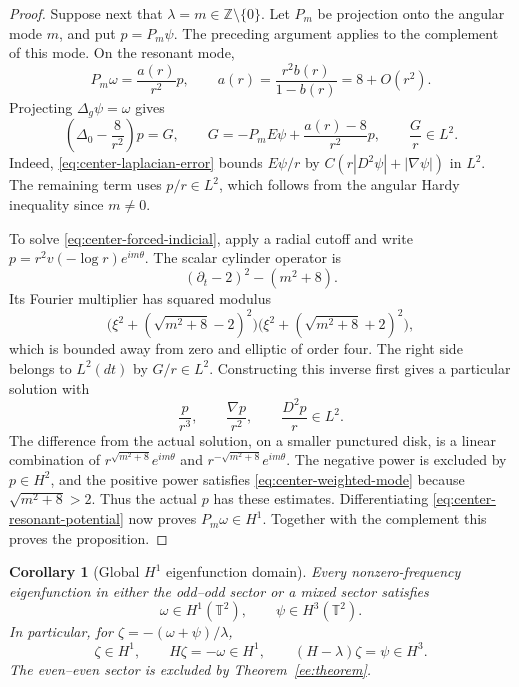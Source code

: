 \documentclass[reqno,11pt]{amsart}
\numberwithin{equation}{section}
\newtheorem{corollary}[theorem]{Corollary}
\theoremstyle{remark}
\begin{document}
\begin{proof}
Suppose next that $\lambda=m\in\mathbb Z\setminus\{0\}$.
Let $P_m$ be projection onto the angular mode $m$, and put
$p=P_m\psi$.  The preceding argument applies to the complement
of this mode.  On the resonant mode,
\begin{equation}
 P_m\omega=\frac{a(r)}{r^2}p,
 \qquad a(r)=\frac{r^2b(r)}{1-b(r)}=8+O(r^2).
 \label{eq:center-resonant-potential}
\end{equation}
Projecting $\Delta_g\psi=\omega$ gives
\begin{equation}
 \left(\Delta_0-\frac8{r^2}\right)p=G,
 \qquad G=-P_m E\psi+\frac{a(r)-8}{r^2}p,
 \qquad \frac Gr\in L^2.
 \label{eq:center-forced-indicial}
\end{equation}
Indeed, \eqref{eq:center-laplacian-error} bounds
$E\psi/r$ by $C(r|D^2\psi|+|\nabla\psi|)$ in $L^2$.
The remaining term uses $p/r\in L^2$, which follows from
the angular Hardy inequality since $m\ne0$.

To solve \eqref{eq:center-forced-indicial}, apply a radial cutoff and write
$p=r^2v(-\log r)e^{im\theta}$.
The scalar cylinder operator is
\[
 (\partial_t-2)^2-(m^2+8).
\]
Its Fourier multiplier has squared modulus
\[
 \big(\xi^2+(\sqrt{m^2+8}-2)^2\big)
 \big(\xi^2+(\sqrt{m^2+8}+2)^2\big),
\]
which is bounded away from zero and elliptic of order four.
The right side belongs to $L^2(dt)$ by $G/r\in L^2$.
Constructing this inverse first gives a particular solution with
\begin{equation}
 \frac p{r^3},\qquad\frac{\nabla p}{r^2},\qquad
 \frac{D^2p}r\in L^2.
 \label{eq:center-weighted-mode}
\end{equation}
The difference from the actual solution, on a smaller punctured
disk, is a linear combination of
$r^{\sqrt{m^2+8}}e^{im\theta}$ and
$r^{-\sqrt{m^2+8}}e^{im\theta}$.
The negative power is excluded by $p\in H^2$, and the positive
power satisfies \eqref{eq:center-weighted-mode} because
$\sqrt{m^2+8}>2$.  Thus the actual $p$ has these estimates.
Differentiating \eqref{eq:center-resonant-potential} now proves
$P_m\omega\in H^1$.  Together with the complement this proves
the proposition.
\end{proof}

\begin{corollary}[Global $H^1$ eigenfunction domain]
\label{cor:global-eigenfunction-h1}
Every nonzero-frequency eigenfunction in either the odd--odd
sector or a mixed sector satisfies
\[
 \omega\in H^1(\mathbb T^2),\qquad \psi\in H^3(\mathbb T^2).
\]
In particular, for $\zeta=-(\omega+\psi)/\lambda$,
\[
 \zeta\in H^1,\qquad H\zeta=-\omega\in H^1,
 \qquad (H-\lambda)\zeta=\psi\in H^3.
\]
The even--even sector is excluded by Theorem~\ref{ee:theorem}.
\end{corollary}
\end{document}
